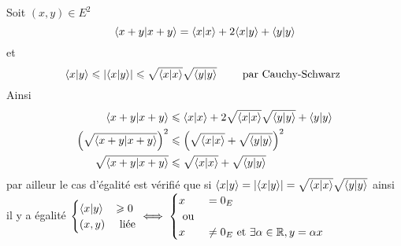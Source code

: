 \begin{dem}
    Soit \((x,y) \in E^2\)\\
    \[\langle x+y | x+y \rangle = \langle x | x \rangle+2\langle x | y \rangle + \langle y | y \rangle\]
    et \[\langle x | y \rangle \leqslant \left\lvert\langle x | y \rangle\right\rvert \leqslant \sqrt{\langle x | x \rangle}\sqrt{\langle y | y \rangle} \qquad \text{ par Cauchy-Schwarz }\]
    Ainsi  \begin{align*}
        \langle x+y | x+y \rangle &\leqslant \langle x | x \rangle+2\sqrt{\langle x | x \rangle}\sqrt{\langle y | y \rangle} + \langle y | y \rangle \\
        \left( \sqrt{\langle x+y | x+y \rangle}\right)^2 &\leqslant \left(\sqrt{\langle x | x \rangle} + \sqrt{\langle y | y \rangle}\right)^2 \\
        \sqrt{\langle x+y | x+y \rangle} &\leqslant\sqrt{\langle x | x \rangle} + \sqrt{\langle y | y \rangle}
    \end{align*}
    par ailleur le cas d'égalité est vérifié que si \(\langle x | y \rangle = \left\lvert\langle x | y \rangle\right\rvert = \sqrt{\langle x | x \rangle}\sqrt{\langle y | y \rangle}\)
    ainsi il y a égalité \ssi \(\begin{cases}
        \langle x | y \rangle &\geqslant 0\\
        (x,y) &\text{ liée}
    \end{cases} \iff \begin{cases}
    x &= 0_E \\
    \text{ ou } \\
    x&\neq 0_E \text{ et } \exists \alpha \in \mathbb{R}, y = \alpha x
    \end{cases}\)
\end{dem}


